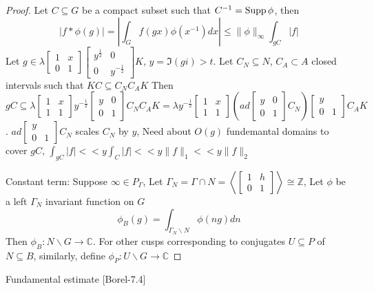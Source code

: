 \documentclass[../main.tex]{subfiles}
\begin{document}
\begin{proof}
Let $C\subseteq G$ be a compact subset such that $C^{-1}=\operatorname{Supp}\phi$, then
\[|f*\phi(g)|=|\int_Gf(gx)\phi(x^{-1})dx|\leq\|\phi\|_\infty\int _{gC}|f|\]
Let $g\in\lambda\begin{bmatrix}
1&x\\
0&1
\end{bmatrix}\begin{bmatrix}
y^{\frac{1}{2}}&0\\
0&y^{-\frac{1}{2}}
\end{bmatrix}K$, $y=\Im(gi)>t$. Let $C_N\subseteq N$, $C_A\subset A$ closed intervals such that $KC\subseteq C_NC_AK$
Then $gC\subseteq\lambda\begin{bmatrix}
1&x\\
1&1
\end{bmatrix}y^{-\frac{1}{2}}\begin{bmatrix}
y&0\\
0&1
\end{bmatrix}C_NC_AK=\lambda y^{-\frac{1}{2}}\begin{bmatrix}
1&x\\
1&1
\end{bmatrix}(ad\begin{bmatrix}
y&0\\
0&1
\end{bmatrix}C_N)\begin{bmatrix}
y&\\
0&1
\end{bmatrix}C_AK$. $ad\begin{bmatrix}
y&\\
0&1
\end{bmatrix}C_N$ scales $C_N$ by $y$, Need about $O(g)$ fundemantal domains to cover $gC$, $\int_{gC}|f|<<y\int_C|f|<<y\|f\|_1<<y\|f\|_2$

Constant term: Suppose $\infty\in P_\Gamma$, Let $\Gamma_N=\Gamma\cap N=\left\langle\begin{bmatrix}
1&h\\
0&1
\end{bmatrix}\right\rangle\cong\mathbb Z$, Let $\phi$ be a left $\Gamma _N$ invariant function on $G$
\[\phi_B(g)=\int_{\Gamma_N\backslash N}\phi(ng)dn\]
Then $\phi_B:N\backslash G\to\mathbb C$. For other cusps corresponding to conjugates $U\subseteq P$ of $N\subseteq B$, similarly, define $\phi_P:U\backslash G\to\mathbb C$
\end{proof}

Fundamental estimate [Borel-7.4]
\end{document}

